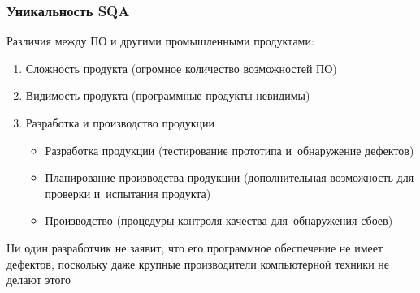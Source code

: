 \documentclass{../industrial-development}
\begin{document}
\begin{frame} \frametitle{Уникальность SQA}
Различия между ПО и другими промышленными продуктами: 
 	 \begin{enumerate}
\item Сложность продукта (огромное количество возможностей ПО)
\item Видимость продукта (программные продукты невидимы)
\item Разработка и производство продукции
	\begin{itemize}
\item Разработка продукции (тестирование прототипа и~обнаружение дефектов)
\item Планирование производства продукции (дополнительная возможность для проверки и~испытания продукта)
\item Производство (процедуры контроля качества для~обнаружения сбоев)
	\end{itemize}
  	\end{enumerate}
\end{frame}

\lecturenotes

Ни один разработчик не заявит, что его программное обеспечение не имеет дефектов, поскольку даже крупные производители компьютерной техники не делают этого
\end{document}
